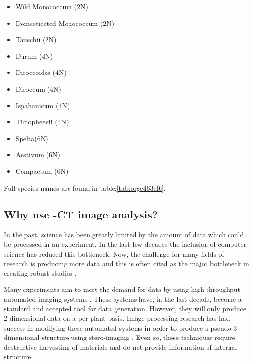 \documentclass[11pt]{report}
\begin{document}
\begin{multicols}{3}

  \begin{itemize}
  \item Wild Monococcum (2N)
  \item Domesticated Monococcum (2N)
  \item Tauschii (2N)
  \end{itemize}

  \columnbreak

  \begin{itemize}
  \item Durum (4N)
  \item Dicoccoides (4N)
  \item Dicoccum (4N)
  \item Ispahanicum (4N)
  \item Timopheevii (4N)
  \end{itemize}

  \columnbreak

  \begin{itemize}
  \item Spelta(6N)
  \item Aestivum (6N)
  \item Compactum (6N)
  \end{itemize}

\end{multicols}
Full species names are found in table:\ref{tab:orge463ef6}.

\subsection{Why use \textmu{}-CT image analysis?}
\label{sec:org8f41022}
In the past, science has been greatly limited by the amount of data which could be processed in an experiment. In the last few decades the inclusion of computer science has reduced this bottleneck. Now, the challenge for many fields of research is producing more data and this is often cited as the major bottleneck in creating robust studies \cite{Furbank2011}.

Many experiments aim to meet the demand for data by using high-throughput automated imaging systems \cite{Naumann2007,Prasanna2013,Humplik2015}. These systems have, in the last decade, become a standard and accepted tool for data generation. However, they will only produce 2-dimensional data on a per-plant basis. Image processing research has had success in modifying these automated systems in order to produce a pseudo 3-dimensional structure using stero-imaging \cite{Roussel2016}. Even so, these techniques require destructive harvesting of materials and do not provide information of internal structure.
\end{document}
